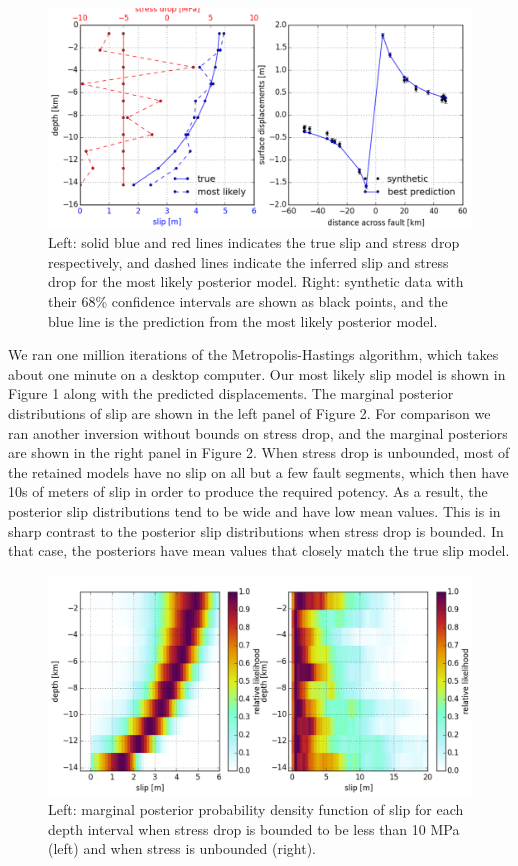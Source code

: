 \documentclass[12pt]{article}
\begin{document}
\begin{figure}
\includegraphics[width=1.0\textwidth]{figure_1}
\caption{Left: solid blue and red lines indicates the true slip and stress drop respectively, and dashed lines indicate the inferred slip and stress drop for the most likely posterior model.  Right: synthetic data with their 68\% confidence intervals are shown as black points, and the blue line is the prediction from the most likely posterior model.}  
\end{figure}

We ran one million iterations of the Metropolis-Hastings algorithm, which takes about one minute on a desktop computer.  Our most likely slip model is shown in Figure 1 along with the predicted displacements.  The marginal posterior distributions of slip are shown in the left panel of Figure 2.  For comparison we ran another inversion without bounds on stress drop, and the marginal posteriors are shown in the right panel in Figure 2.  When stress drop is unbounded, most of the retained models have no slip on all but a few fault segments, which then have 10s of meters of slip in order to produce the required potency.  As a result, the posterior slip distributions tend to be wide and have low mean values.  This is in sharp contrast to the posterior slip distributions when stress drop is bounded.  In that case, the posteriors have mean values that closely match the true slip model.   

\begin{figure}
\includegraphics[width=1.0\textwidth]{figure_2}
\raggedleft
\caption{Left: marginal posterior probability density function of slip for each depth interval when stress drop is bounded to be less than 10 MPa (left) and when stress is unbounded (right).}  
\end{figure}
\end{document}
